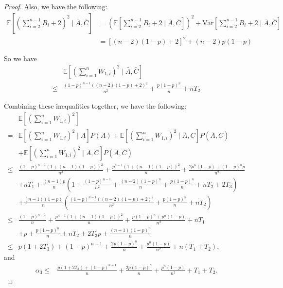 \begin{lemma}
\begin{proof}
Also, we have the following:
\begin{align*}
	\mathbb{E} \left[\left(\sum\limits_{i=2}^{n-1}B_i + 2\right)^2\mid \bar{A}, \bar{C}\right] &= \left(\mathbb{E} \left[\sum\limits_{i=2}^{n-1}B_i + 2\mid \bar{A}, \bar{C}\right]\right)^2 + \mathrm{Var}\left[\sum\limits_{i=2}^{n-1}B_i+2\mid\bar{A},\bar{C}\right]\\
	&=[(n-2)(1-p)+2]^2 + (n-2)p(1-p)
\end{align*}

So we have
\begin{align*}
&\mathbb{E} \left[\left(\sum\limits_{i=1}^n W_{1,i}\right)^2 \mid \bar{A}, \bar{C}\right]\\
\leq & \frac{(1-p)^{n-1}((n-2)(1-p) + 2)^2}{n^2} + \frac{p(1-p)^n}{n} + nT_2
\end{align*}

Combining these inequalities together, we have the following:
\begin{align*}
	&\mathbb{E} \left[\left(\sum\limits_{i=1}^n W_{1,i}\right)^2\right]\\
	=&\mathbb{E} \left[\left(\sum\limits_{i=1}^n W_{1,i}\right)^2\mid A\right]P(A) + \mathbb{E} \left[\left(\sum\limits_{i=1}^n W_{1,i}\right)^2\mid \bar{A},C\right]P(\bar{A},C)\\
	& + \mathbb{E} \left[\left(\sum\limits_{i=1}^n W_{1,i}\right)^2 \mid \bar{A}, \bar{C}\right]P(\bar{A},\bar{C})\\
	\leq & \frac{(1-p)^{n-1}(1+(n-1)(1-p))^2}{n^3} + \frac{p^{n-1}(1+(n-1)(1-p))^2}{n} + \frac{2p^n(1-p) + (1-p)^np}{n^2}\\
	& + n T_1 +   \frac{(n-1)p}{n}\left( 1 + \frac{(1-p)^{n-1}}{n^2} + \frac{(n-2)(1-p)^n}{n} + \frac{p(1-p)^n}{n} + nT_2  + 2T_3 \right) \\
	& + \frac{(n-1)(1-p)}{n} \left( \frac{(1-p)^{n-1}((n-2)(1-p) + 2)^2}{n^2} + \frac{p(1-p)^n}{n} + nT_2 \right)\\
	\leq & \frac{(1-p)^{n-1}}{n} + \frac{p^{n-1}(1+(n-1)(1-p))^2}{n} + \frac{p(1-p)^n+p^n(1-p)}{n^2} + nT_1\\
	& + p + \frac{p(1-p)^n}{n} + nT_2 + 2T_3p + \frac{(n-1)(1-p)^n}{n}\\
	\leq & p(1+2T_3) + (1-p)^{n-1} + \frac{2p(1-p)^n}{n} + \frac{p^n(1-p)}{n^2} + n(T_1+T_2),
\end{align*}
and
\begin{align*}
\alpha_3 \leq & \frac{p(1+2T_3) + (1-p)^{n-1}}{n} + \frac{2p(1-p)^n}{n} + \frac{p^n(1-p)}{n^2} + T_1 + T_2.
\end{align*}

	
\end{proof}
\end{lemma}










